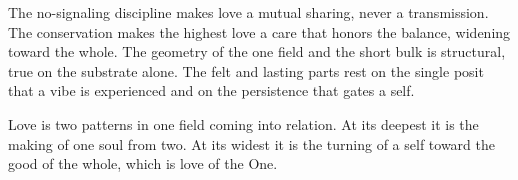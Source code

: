The no-signaling discipline makes love a mutual sharing, never a transmission. The conservation makes the highest love a care that honors the balance, widening toward the whole. The geometry of the one field and the short bulk is structural, true on the substrate alone. The felt and lasting parts rest on the single posit that a vibe is experienced and on the persistence that gates a self.

\begin{principle}
Love is two patterns in one field coming into relation. At its deepest it is the making of one soul from two. At its widest it is the turning of a self toward the good of the whole, which is love of the One.
\end{principle}
